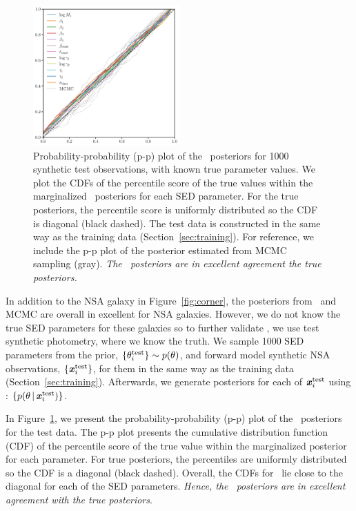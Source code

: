 \begin{figure}
\begin{center}
    \includegraphics[width=0.5\textwidth]{figs/ppplot.pdf}
    \caption{\label{fig:pp}
    Probability-probability (p-p) plot of the \sedflow~posteriors for 1000
    synthetic test observations, with known true parameter values. 
    We plot the CDFs of the percentile score of the true values within the
    marginalized \sedflow~posteriors for each SED parameter.
    For the true posteriors, the percentile score is uniformly distributed so
    the CDF is diagonal (black dashed).
    The test data is constructed in the same way as the training data
    (Section~\ref{sec:training}). 
    For reference, we include the p-p plot of the posterior estimated from MCMC
    sampling (gray). 
    \emph{The \sedflow~posteriors are in excellent agreement the true
    posteriors.}
    }
\end{center}
\end{figure}
In addition to the NSA galaxy in Figure~\ref{fig:corner}, the posteriors from
\sedflow~and MCMC are overall in excellent for NSA galaxies.
However, we do not know the true SED parameters for these galaxies so to
further validate \sedflow, we use test synthetic photometry, where we know the
truth.
We sample 1000 SED parameters from the prior,
$\{\theta^{\rm test}_i\} \sim p(\theta)$, 
and forward model synthetic NSA observations, 
$\{\textbf{\textit{x}}^{\rm test}_i\}$, 
for them in the same way as the training data (Section~\ref{sec:training}). 
Afterwards, we generate posteriors for each of $\textbf{\textit{x}}^{\rm test}_i$ using 
\sedflow: $\{ p(\theta \,|\, \textbf{\textit{x}}^{\rm test}_i)\}$. 

In Figure~\ref{fig:pp}, we present the probability-probability (p-p) plot of
the \sedflow~posteriors for the test data. 
The p-p plot presents the cumulative distribution function (CDF) of the
percentile score of the true value within the marginalized posterior for each
parameter. 
For true posteriors, the percentiles are uniformly distributed so the CDF is a
diagonal (black dashed).
Overall, the CDFs for \sedflow~lie close to the diagonal for each of the SED
parameters. 
\emph{Hence, the \sedflow~posteriors are in excellent agreement with the true
posteriors}.

